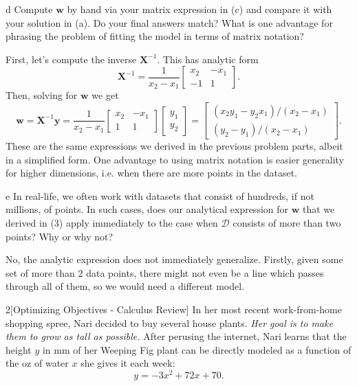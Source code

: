 \documentclass[expanded]{pset}
\begin{document}
\begin{parts}
  \begin{part}{d}
    Compute $\mathbf{w}$ by hand via your matrix expression in (c) and compare it with your solution in (a). Do your final answers match? What is one advantage for phrasing the problem of fitting the model in terms of matrix notation? 
  \end{part}

  First, let's compute the inverse $\mathbf{X}^{-1}$. This has analytic form
  \[
    \mathbf{X}^{-1} = \frac{1}{x_2 - x_1}\begin{bmatrix}x_2 & -x_1\\ -1 & 1\end{bmatrix}.
  \]
  Then, solving for $\mathbf{w}$ we get
  \[
    \mathbf{w} = \mathbf{X}^{-1}\mathbf{y} = \frac{1}{x_2 - x_1}\begin{bmatrix}x_2 & -x_1\\ 1 & 1\end{bmatrix}\begin{bmatrix}y_1\\ y_2\end{bmatrix} = \begin{bmatrix} (x_2 y_1 - y_2 x_1)/(x_2-x_1)\\ (y_2 - y_1)/(x_2 - x_1)\end{bmatrix}.
  \]
  These are the same expressions we derived in the previous problem parts, albeit in a simplified form. One advantage to using matrix notation is easier generality for higher dimensions, i.e. when there are more points in the dataset.

  \begin{part}{e}
    In real-life, we often work with datasets that consist of hundreds, if not millions, of points. In such cases, does our analytical expression for $\mathbf{w}$ that we derived in (3) apply immediately to the case when $\mathcal{D}$ consists of more than two points? Why or why not?
  \end{part}

  No, the analytic expression does not immediately generalize. Firstly, given some set of more than $2$ data points, there might not even be a line which passes through all of them, so we would need a different model.
\end{parts}

\begin{problem}{2}[Optimizing Objectives - Calculus Review]
   In her most recent work-from-home shopping spree, Nari decided to buy several house plants. \textit{Her goal is to make them to grow as tall as possible.} After perusing the internet, Nari learns that the height $y$ in mm of her Weeping Fig plant can be directly modeled as a function of the oz of water $x$ she gives it each week:
$$y = - 3x^2 + 72x + 70.$$
\end{problem}
\end{document}
